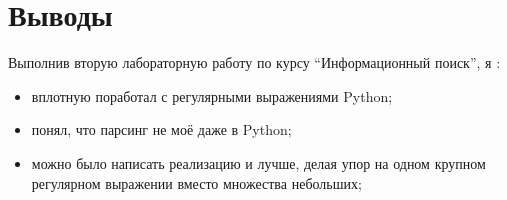 \section{Выводы}

Выполнив вторую лабораторную работу по курсу \enquote{Информационный поиск}, я :
\begin{itemize}
    \item вплотную поработал с регулярными выражениями Python;
    \item понял, что парсинг не моё даже в Python;
    \item можно было написать реализацию и лучше, делая упор на одном крупном регулярном выражении вместо множества небольших;
\end{itemize}
\pagebreak
